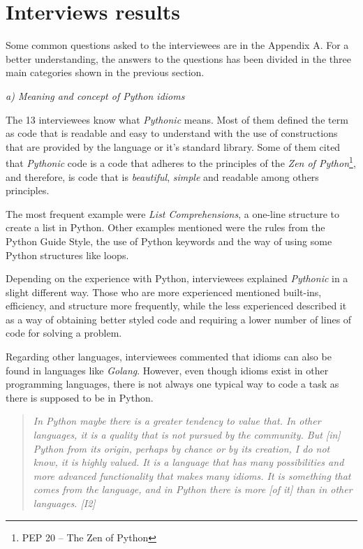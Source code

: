 \documentclass[a4paper]{article}
\begin{document}
\section{Interviews results}

Some common questions asked to the interviewees are in the Appendix A. For a better understanding, the answers to the questions has been divided in the three main categories shown in the previous section.

\textit{a) Meaning and concept of Python idioms}

The 13 interviewees know what \textit{Pythonic} means. Most of them defined the term as code that is readable and easy to understand with the use of constructions that are provided by the language or it's standard library.
Some of them cited that \textit{Pythonic} code is a code that adheres to the principles of the \textit{Zen of Python}\footnote{PEP 20 -- The Zen of Python}, and therefore, is code that is \textit{beautiful}, \textit{simple} and readable among others principles.

The most frequent example were \textit{List Comprehensions}, a one-line structure to create a list in Python. Other examples mentioned were the rules from the Python Guide Style, the use of Python keywords and the way of using some Python structures like loops.


Depending on the experience with Python, interviewees explained \textit{Pythonic} in a slight different way. Those who are more experienced mentioned built-ins, efficiency, and structure more frequently, while the less experienced described it as a way of obtaining better styled code and requiring a lower number of lines of code for solving a problem. 

Regarding other languages, interviewees commented that idioms can also be found in languages like \textit{Golang}. However, even though idioms exist in other programming languages, there is not always one typical way to code a task as there is supposed to be in Python.
\begin{quote}
\textit{
    In Python maybe there is a greater tendency to value that. In other languages, it is a quality that is not pursued by the community. But [in] Python from its origin, perhaps by chance or by its creation, I do not know, it is highly valued. It is a language that has many possibilities and more advanced functionality that makes many idioms. It is something that comes from the language, and in Python there is more [of it] than in other languages. [I2]
}
\end{quote}
\end{document}
